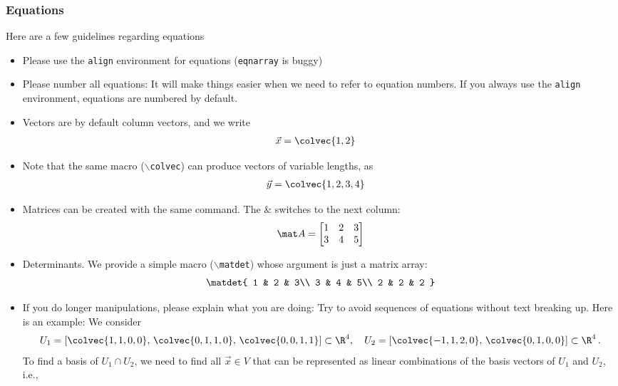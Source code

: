 \documentclass[12pt,twoside]{article}
\begin{document}
	\subsubsection{Equations}
	Here are a few guidelines regarding equations
	\begin{itemize}
		\item Please use the \texttt{align} environment for equations (\texttt{eqnarray} is buggy)
		\item Please number all equations: It will make things easier when we need to refer to equation numbers. If you always use the \texttt{align} environment, equations are numbered by default.
		\item Vectors are by default column vectors, and we write 
		\begin{align}
		\vec x &= \colvec{1,2}
		\end{align}
		\item Note that the same macro (\texttt{$\backslash$colvec}) can produce vectors of variable lengths, as
		\begin{align}
		\vec y &= \colvec{1,2,3,4}
		\end{align}
		\item Matrices can be created with the same command. The \& switches to the next column:
		\begin{align}
		\mat A = \begin{bmatrix}
		1 & 2 & 3\\
		3 & 4 & 5
		\end{bmatrix}
		\end{align}
		\item Determinants. We provide a simple macro (\texttt{$\backslash$matdet}) whose argument is just a matrix array:
		\begin{align}
		\matdet{
			1 & 2 & 3\\
			3 & 4 & 5\\
			2 & 2 & 2
		}
		\end{align}
		\item If you do longer manipulations, please explain what you are doing: Try to avoid sequences of equations without text breaking up. Here is an example:
		We consider
		\begin{align}
		U_1 = [\colvec{1,1,0,0},\, \colvec{0,1,1,0},\, \colvec{0,0,1,1}]
		\subset\R^4, \quad 
		U_2 = [\colvec{-1,1,2,0},\, \colvec{0,1,0,0}]
		\subset\R^4\,.
		\end{align}
		To find a basis of $U_1\cap U_2$, we need to find all $\vec x \in V$ that can be represented as linear combinations of the basis vectors of $U_1$ and $U_2$, i.e., 

\end{itemize}
\end{document}
